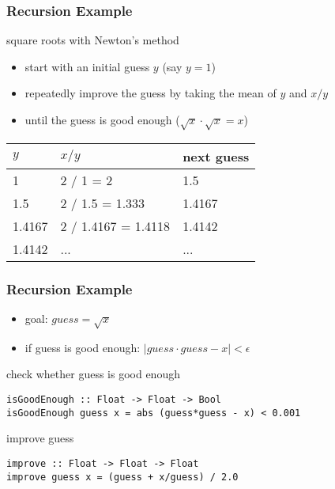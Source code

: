 \documentclass[dvipsnames]{beamer}
\theoremstyle{plain}
\begin{document}
\begin{frame}
  \frametitle{Recursion Example}

  \begin{exampleblock}{square roots with Newton's method}
    \begin{itemize}
      \item start with an initial guess $y$ (say $y = 1$)
      \item repeatedly improve the guess by taking the mean of $y$
        and $x / y$
      \item until the guess is good enough ($\sqrt x \cdot \sqrt x = x$)
    \end{itemize}

    \medskip
    \begin{center}
      \begin{tabular}{lll}
      $y$      & $x / y$             & next guess\\\hline
      1        & 2 / 1 = 2           & 1.5\\
      1.5      & 2 / 1.5 = 1.333     & 1.4167\\
      1.4167   & 2 / 1.4167 = 1.4118 & 1.4142\\
      1.4142   & ...                 & ...
      \end{tabular}
    \end{center}
  \end{exampleblock}
\end{frame}

\begin{frame}[fragile]
  \frametitle{Recursion Example}

  \begin{itemize}
    \item goal: $guess = \sqrt x$
    \item if guess is good enough: $|guess \cdot guess - x| < \epsilon$
  \end{itemize}

  \pause
  \begin{exampleblock}{check whether guess is good enough}
    \begin{lstlisting}
isGoodEnough :: Float -> Float -> Bool
isGoodEnough guess x = abs (guess*guess - x) < 0.001
    \end{lstlisting}
  \end{exampleblock}

  \pause
  \begin{exampleblock}{improve guess}
    \begin{lstlisting}
improve :: Float -> Float -> Float
improve guess x = (guess + x/guess) / 2.0
    \end{lstlisting}
  \end{exampleblock}
\end{frame}
\end{document}
